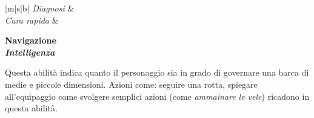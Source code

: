 \documentclass[../manuale_main.tex]{subfiles}
\begin{document}
\begin{tabularx}{\linewidth}{|m|s|b|}
        \textit{Diagnosi} &  \\\hline
        \textit{Cura rapida} &  \\\hline
\end{tabularx}


\clearpage


\begin{center}
\textbf{ \large{Navigazione}}\\ \textit{\textbf{ Intelligenza}}
\\
\end{center}
 Questa abilità indica quanto il personaggio sia in grado di governare una barca di medie e piccole dimensioni. Azioni come: seguire una rotta, spiegare all'equipaggio come svolgere semplici azioni (come \textit{ ammainare le vele}) ricadono in questa abilità. 
\end{document}
